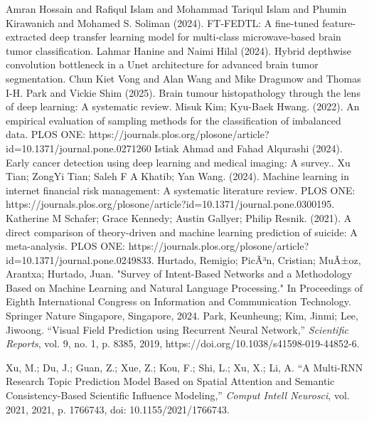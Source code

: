 \documentclass[runningheads]{llncs}
\begin{document}
\begin{thebibliography}{00}
     Amran Hossain and Rafiqul Islam and Mohammad Tariqul Islam and Phumin Kirawanich and Mohamed S. Soliman (2024). FT-FEDTL: A fine-tuned feature-extracted deep transfer learning model for multi-class microwave-based brain tumor classification.
 Lahmar Hanine and Naimi Hilal (2024). Hybrid depthwise convolution bottleneck in a Unet architecture for advanced brain tumor segmentation.
 Chun Kiet Vong and Alan Wang and Mike Dragunow and Thomas I-H. Park and Vickie Shim (2025). Brain tumour histopathology through the lens of deep learning: A systematic review.
 Misuk Kim; Kyu-Baek Hwang. (2022). An empirical evaluation of sampling methods for the classification of imbalanced data. PLOS ONE: https://journals.plos.org/plosone/article?id=10.1371/journal.pone.0271260
 Istiak Ahmad and Fahad Alqurashi (2024). Early cancer detection using deep learning and medical imaging: A survey..
 Xu Tian; ZongYi Tian; Saleh F A Khatib; Yan Wang. (2024). Machine learning in internet financial risk management: A systematic literature review. PLOS ONE: https://journals.plos.org/plosone/article?id=10.1371/journal.pone.0300195.
 Katherine M Schafer; Grace Kennedy; Austin Gallyer; Philip Resnik. (2021). A direct comparison of theory-driven and machine learning prediction of suicide: A meta-analysis. PLOS ONE: https://journals.plos.org/plosone/article?id=10.1371/journal.pone.0249833.
    Hurtado, Remigio; PicÃ³n, Cristian; MuÃ±oz, Arantxa; Hurtado, Juan.
    "Survey of Intent-Based Networks and a Methodology Based on Machine Learning and Natural Language Processing."
    In Proceedings of Eighth International Congress on Information and Communication Technology.
    Springer Nature Singapore, Singapore, 2024.
    Park, Keunheung; Kim, Jinmi; Lee, Jiwoong. 
    ``Visual Field Prediction using Recurrent Neural Network,'' 
    \emph{Scientific Reports}, 
    vol. 9, no. 1, p. 8385, 
    2019, 
    https://doi.org/10.1038/s41598-019-44852-6.
    
    Xu, M.; Du, J.; Guan, Z.; Xue, Z.; Kou, F.; Shi, L.; Xu, X.; Li, A. 
    ``A Multi-RNN Research Topic Prediction Model Based on Spatial Attention and Semantic Consistency-Based Scientific Influence Modeling,'' 
    \emph{Comput Intell Neurosci}, 
    vol. 2021, 
    2021, 
    p. 1766743, 
    doi: 10.1155/2021/1766743.
    

\end{thebibliography}
\end{document}
